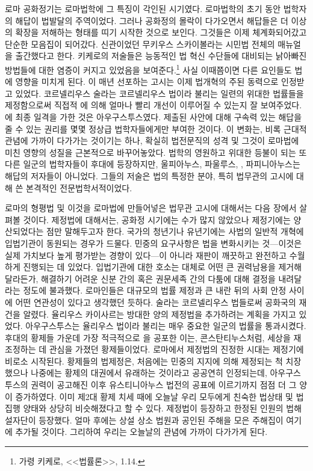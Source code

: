 로마 공화정기는 로마법학에 그 특징이 각인된 시기였다.
로마법학의 초기 동안 법학자의 해답이 법발달의 주역이었다.
그러나 공화정의 몰락이 다가오면서 해답들은 더 이상의 확장을 저해하는
형태를 띠기 시작한 것으로 보인다.
그것들은 이제 체계화되어갔고 단순한 모음집이 되어갔다.
신관이었던
무키우스 스카이볼라는
시민법 전체의 매뉴얼을 출간했다고 한다.
키케로의 저술들은
능동적인 법 혁신 수단들에 대비되는 낡아빠진 방법들에 대한 염증이
커지고 있었음을 보여준다.\footnote{%
  가령 키케로, <<법률론>>, 1.14. }
사실 이때쯤이면 다른 요인들도 법에 영향을 미치게 된다.
이 매년 선포하는 고시는
이제 법개혁의 주된 동력으로 인정받고 있었다.
코르넬리우스 술라는
코르넬리우스 법이라 불리는 일련의 위대한 법률들을
제정함으로써 직접적 에 의해 얼마나 빨리 개선이 이루어질 수 있는지
잘 보여주었다.
에 최종 일격을 가한 것은 아우구스투스였다.
제출된 사안에 대해 구속력 있는 해답을 줄 수 있는 권리를
몇몇 정상급 법학자들에게만 부여한 것이다.
이 변화는, 비록 근대적 관념에 가까이 다가가는 것이기는 하나,
확실히 법전문직의 성격 및 그것이 로마법에 미친 영향의 성질을
근본적으로 바꾸어놓았다.
법학의 영원하고 위대한 등불이 되는
또 다른 일군의 법학자들이 후대에 등장하지만,
울피아누스, 파울루스, , 파피니아누스는 해답의 저자들이 아니었다.
그들의 저술은 법의 특정한 분야, 특히 법무관의 고시에 대해 쓴
본격적인 전문법학서적이었다.

로마의 형평법 및 이것을 로마법에 만들어넣은 법무관 고시에 대해서는
다음 장에서 살펴볼 것이다.
제정법에 대해서는, 공화정 시기에는 수가 많지 않았으나
제정기에는 양산되었다는 점만 말해두고자 한다.
국가의 청년기나 유년기에는 사법의 일반적 개혁에
입법기관이 동원되는 경우가 드물다.
민중의 요구사항은 법을 변화시키는
것---이것은 실제 가치보다 높게 평가받는 경향이 있다---이 아니라
재판이 깨끗하고 완전하고 수월하게 진행되는 데 있었다.
입법기관에 대한 호소는 대체로 어떤 큰 권력남용을 제거해달라든가,
해결하기 어려운 신분 간의 혹은 권문세족 간의 다툼에 대해
결정을 내려달라는 정도에 불과했다.
로마인들은 대규모의 법률 제정과
큰 내란 뒤의 사회 안정 사이에
어떤 연관성이 있다고 생각했던 듯하다.
술라는 코르넬리우스 법들로써 공화국의 재건을 알렸다.
율리우스 카이사르는 방대한 양의 제정법을 추가하려는 계획을 가지고 있었다.
아우구스투스는 율리우스 법이라 불리는
매우 중요한 일군의 법률을 통과시켰다.
후대의 황제들 가운데 가장 적극적으로 을 공포한 이는,
콘스탄티누스처럼, 세상을 재조정하는 데 관심을 가졌던 황제들이었다.
로마에서 제정법의 진정한 시대는 제정기에 비로소 시작된다.
황제들의 법제정은,
처음에는 민중의 지지에 의해 제정되는 척 치장했으나
나중에는 황제의 대권에서 유래하는 것이라고 공공연히 인정되는데,
아우구스투스의 권력이 공고해진 이후 유스티니아누스 법전의 공표에 이르기까지
점점 더 그 양이 증가하였다.
이미 제2대 황제 치세 때에 오늘날 우리 모두에게 친숙한 법상태 및
법집행 양태와 상당히 비슷해졌다고 할 수 있다.
제정법이 등장하고 한정된 인원의 법해설자단이 등장했다.
얼마 후에는 상설 상소 법원과 공인된 주해을 모은 주해집이 여기에 추가될 것이다.
그리하여 우리는 오늘날의 관념에 가까이 다가가게 된다.

